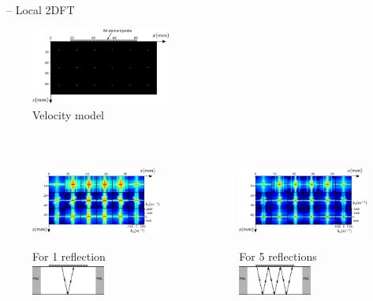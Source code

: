 \documentclass[10pt,xcolor=x11names,compress, notes=show]{beamer}%
\begin{document}
\begin{frame}{\insertsectionhead~-- Local 2DFT}
	\begin{figure}
		\includegraphics[height=2.5cm]{img/vp_scat.png}\\
		\vspace{-0.3cm} \small{Velocity model}
	\end{figure}
	\vspace{-0.6cm} 
	\begin{columns}
		\begin{figure}
			\includegraphics[height=3cm]{img/1400pt.png}\\
			\small{For 1 reflection}\\[0.3cm]
			\includegraphics[height=1cm]{img/1ref.png}
		\end{figure}
		\begin{figure}
			\includegraphics[height=3cm]{img/4200pt.png}\\
			\small{For 5 reflections}\\[0.3cm]
			\includegraphics[height=1cm]{img/6ref.png}
		\end{figure}
	\end{columns}

\end{frame}
\end{document}
